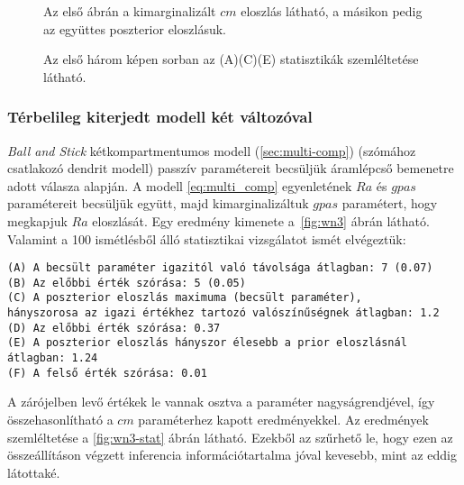 \begin{figure}
	\hfill
	\hfill
	\hfill
	\caption[Egykompartmentumos, fehér zaj, két paraméteres becslés]{Az első ábrán a kimarginalizált $cm$ eloszlás látható, a másikon pedig az együttes poszterior eloszlásuk. }%
	\label{fig:wn2}
\end{figure}

\begin{figure}
	\hfill
	\hfill
	\hfill
	\vfill
	\caption[Egykompartmentum, fehér zaj, két paraméter statisztika]{Az első három képen sorban az (A)(C)(E) statisztikák szemléltetése látható.}%
	\label{fig:wn2-stat}
\end{figure}

\FloatBarrier
\subsubsection{Térbelileg kiterjedt modell két változóval}
\textit{Ball and Stick} kétkompartmentumos modell (\ref{sec:multi-comp}) (szómához csatlakozó dendrit modell) passzív paramétereit becsüljük áramlépcső bemenetre adott válasza alapján. A modell \ref{eq:multi_comp} egyenletének $Ra$ és $gpas$ paramétereit becsüljük együtt, majd kimarginalizáltuk $gpas$ paramétert, hogy megkapjuk $Ra$ eloszlását. Egy eredmény kimenete a~\ref{fig:wn3} ábrán látható. Valamint a 100 ismétlésből álló statisztikai vizsgálatot ismét elvégeztük:

\begin{verbatim}
(A) A becsült paraméter igazitól való távolsága átlagban: 7 (0.07)
(B) Az előbbi érték szórása: 5 (0.05)
(C) A poszterior eloszlás maximuma (becsült paraméter), 
hányszorosa az igazi értékhez tartozó valószínűségnek átlagban: 1.2
(D) Az előbbi érték szórása: 0.37
(E) A poszterior eloszlás hányszor élesebb a prior eloszlásnál átlagban: 1.24
(F) A felső érték szórása: 0.01
\end{verbatim}
A zárójelben levő értékek le vannak osztva a paraméter nagyságrendjével, így összehasonlítható a $cm$ paraméterhez kapott eredményekkel. Az eredmények szemléltetése a \ref{fig:wn3-stat} ábrán látható. Ezekből az szűrhető le, hogy ezen az összeállításon végzett inferencia információtartalma jóval kevesebb, mint az eddig látottaké.

